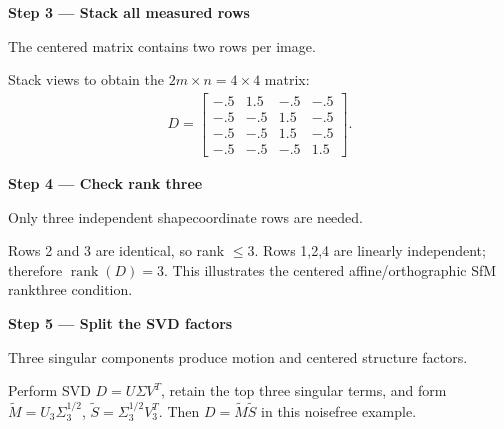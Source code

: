 \documentclass[letterpaper,11pt,english,openany,oneside]{jupyterBook}
\begin{document}
\par\medskip{}
{\color{QuizStepRed}\bfseries Step 3 — Stack all measured rows}\par\smallskip

\sphinxAtStartPar
{} The centered matrix contains two rows per image.

\sphinxAtStartPar
Stack views to obtain the {\color{QuizMathBlue} \(2m\times n=4\times4\)} matrix:
{\color{QuizMathBlue} \begin{equation*}
\begin{split}
\boxed{D=\begin{bmatrix}-.5&1.5&-.5&-.5\\-.5&-.5&1.5&-.5\\-.5&-.5&1.5&-.5\\-.5&-.5&-.5&1.5\end{bmatrix}}.
\end{split}
\end{equation*}}
\par

\par\medskip{}
{\color{QuizStepRed}\bfseries Step 4 — Check rank three}\par\smallskip

\sphinxAtStartPar
{} Only three independent shape\sphinxhyphen{}coordinate rows are needed.

\sphinxAtStartPar
Rows 2 and 3 are identical, so rank {\color{QuizMathBlue} \(\le3\)}. Rows 1,2,4 are linearly independent; therefore {\color{QuizMathBlue} \(\boxed{\operatorname{rank}(D)=3}\)}. This illustrates the centered affine/orthographic SfM rank\sphinxhyphen{}three condition.

\par

\par\medskip{}
{\color{QuizStepRed}\bfseries Step 5 — Split the SVD factors}\par\smallskip

\sphinxAtStartPar
{} Three singular components produce motion and centered structure factors.

\sphinxAtStartPar
Perform SVD {\color{QuizMathBlue} \(D=U\Sigma V^T\)}, retain the top three singular terms, and form {\color{QuizMathBlue} \(\widetilde M=U_3\Sigma_3^{1/2}\)}, {\color{QuizMathBlue} \(\widetilde S=\Sigma_3^{1/2}V_3^T\)}. Then {\color{QuizMathBlue} \(D=\widetilde M\widetilde S\)} in this noise\sphinxhyphen{}free example.
\end{document}
